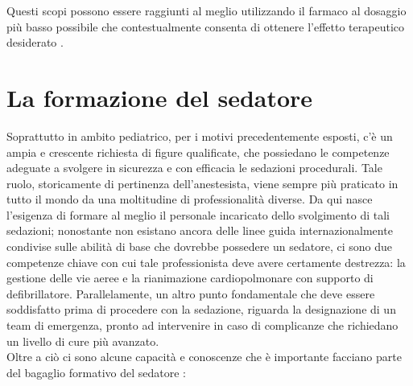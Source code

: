Questi scopi possono essere raggiunti al meglio utilizzando il farmaco al dosaggio più basso possibile che contestualmente consenta di ottenere l'effetto terapeutico desiderato \cite{Guidelines2019}.

\section{La formazione del sedatore}

Soprattutto in ambito pediatrico, per i motivi precedentemente esposti, c'è un ampia e crescente richiesta di figure qualificate, che possiedano le competenze adeguate a svolgere in sicurezza e con efficacia le sedazioni procedurali. Tale ruolo, storicamente di pertinenza dell'anestesista, viene sempre più praticato in tutto il mondo da una moltitudine di professionalità diverse. Da qui nasce l'esigenza di formare al meglio il personale incaricato dello svolgimento di tali sedazioni; nonostante non esistano ancora delle linee guida internazionalmente condivise sulle abilità di base che dovrebbe possedere un sedatore, ci sono due competenze chiave con cui tale professionista deve avere certamente destrezza: la gestione delle vie aeree e la rianimazione cardiopolmonare con supporto di defibrillatore. Parallelamente, un altro punto fondamentale che deve essere soddisfatto prima di procedere con la sedazione, riguarda la designazione di un team di emergenza, pronto ad intervenire in caso di complicanze che richiedano un livello di cure più avanzato.
\\Oltre a ciò ci sono alcune capacità e conoscenze che è importante facciano parte del bagaglio formativo del sedatore \cite{Simeupsedazione, Berkenbosch2015}: 
